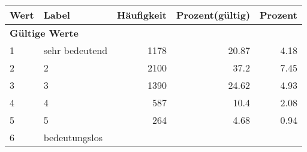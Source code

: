      \begin{longtable}{lXrrr}
     \toprule
     \textbf{Wert} & \textbf{Label} & \textbf{Häufigkeit} & \textbf{Prozent(gültig)} & \textbf{Prozent} \\
     \endhead
     \midrule
     \multicolumn{5}{l}{\textbf{Gültige Werte}}\\

     1 &
     \multicolumn{1}{X}{ sehr bedeutend   } &


       \num{1178} &
       \num[round-mode=places,round-precision=2]{20,87} &
         \num[round-mode=places,round-precision=2]{4,18} \\

     2 &
     \multicolumn{1}{X}{ 2   } &


       \num{2100} &
       \num[round-mode=places,round-precision=2]{37,2} &
         \num[round-mode=places,round-precision=2]{7,45} \\

     3 &
     \multicolumn{1}{X}{ 3   } &


       \num{1390} &
       \num[round-mode=places,round-precision=2]{24,62} &
         \num[round-mode=places,round-precision=2]{4,93} \\

     4 &
     \multicolumn{1}{X}{ 4   } &


       \num{587} &
       \num[round-mode=places,round-precision=2]{10,4} &
         \num[round-mode=places,round-precision=2]{2,08} \\

     5 &
     \multicolumn{1}{X}{ 5   } &


       \num{264} &
       \num[round-mode=places,round-precision=2]{4,68} &
         \num[round-mode=places,round-precision=2]{0,94} \\

     6 &
     \multicolumn{1}{X}{ bedeutungslos   } &



\end{longtable}
